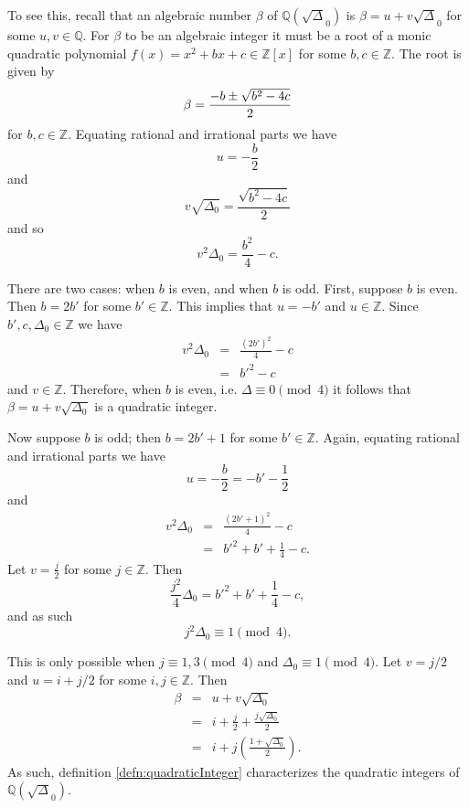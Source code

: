 \documentclass{ucalgthes1}
\theoremstyle{plain}
\theoremstyle{definition}
\newcommand{\ZZ}{\mathbb{Z}}
\newcommand{\QQ}{\mathbb{Q}}
\begin{document}
\noindent
To see this, recall that an algebraic number $\beta$ of $\QQ(\sqrt\Delta_0)$ is $\beta = u+v\sqrt\Delta_0$ for some $u,v \in \QQ$.  For $\beta$ to be an  algebraic integer it must be a root of a monic quadratic polynomial $f(x) = x^2+bx+c \in \ZZ[x]$ for some $b,c \in \ZZ$.  The root is given by
\begin{equation*}
	\beta = \frac{-b \pm \sqrt{b^2-4c}}{2} \\
\end{equation*}
for $b,c \in \ZZ$. Equating rational and irrational parts we have
\begin{equation*}
	u = -\frac{b}{2}
\end{equation*}
and
\begin{equation*}
	v \sqrt{\Delta_0} = \frac{\sqrt{b^2 -4c}}{2}
\end{equation*}
and so
\begin{equation*}
	v^2 \Delta_0 = \frac{b^2}{4} - c.
\end{equation*}


There are two cases: when $b$ is even, and when $b$ is odd.  First, suppose $b$ is even.  Then $b=2b'$ for some $b' \in \ZZ$.  This implies that $u = -b'$ and $u \in \ZZ$.  Since $b', c, \Delta_0 \in \ZZ$ we have
\begin{eqnarray*}
	v^2 \Delta_0 & = & \frac{(2b')^2}{4} - c \\
	& = & b'^2 - c
\end{eqnarray*}
and $v \in \ZZ$.  Therefore, when $b$ is even, i.e. $\Delta \equiv 0 \pmod 4$ it follows that $\beta = u + v \sqrt{\Delta_0}$ is a quadratic integer.

\bigbreak
Now suppose $b$ is odd; then $b=2b' + 1$ for some $b' \in \ZZ$.  Again, equating rational and irrational parts we have
\[
	u = - \frac{b}{2} = -b' - \frac{1}{2}
\]
and
\begin{eqnarray*}
	v^2 \Delta_0 & = & \frac{(2b'+1)^2}{4} - c \\
	& = & b'^2 + b' + \frac{1}{4} -c.
\end{eqnarray*}
Let $v = \frac{j}{2}$ for some $j \in \ZZ$.  Then
\begin{equation*}
	\frac{j^2}{4} \Delta_0 = b'^2 + b' + \frac{1}{4} -c,
\end{equation*}
and as such
\begin{equation*}
	j^2 \Delta_0 \equiv 1 \pmod 4.
\end{equation*}

\noindent
This is only possible when $j \equiv 1,3 \pmod 4$ and $\Delta_0 \equiv 1 \pmod 4$.  Let $v = j/2$ and $u = i + j/2$ for some $i, j \in \ZZ$.  Then
\begin{eqnarray*}
	\beta & = & u + v \sqrt{\Delta_0} \\
	& = & i + \frac{j}{2} + \frac{j \sqrt{\Delta_0}}{2} \\
	& = & i + j \left( \frac{1 + \sqrt{\Delta_0}}{2} \right).
\end{eqnarray*}
As such, definition \ref{defn:quadraticInteger} characterizes the quadratic integers of $\QQ(\sqrt\Delta_0)$.
\end{document}
